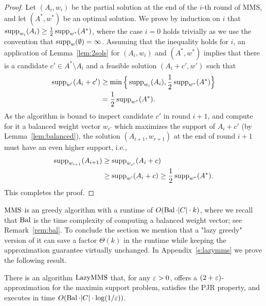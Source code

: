 \begin{proof}
Let $(A_i, w_i)$ be the partial solution at the end of the $i$-th round of MMS, and let $(A^*, w^*)$ be an optimal solution. 
We prove by induction on $i$ that $\operatorname{supp}_{w_i}(A_i)\geq \frac{1}{2}\operatorname{supp}_{w^*}(A^*)$, where the case $i=0$ holds trivially as we use the convention that $\operatorname{supp}_w(\emptyset)=\infty$.
Assuming that the inequality holds for $i$, an application of Lemma~\ref{lem:2sols} for $(A_i, w_i)$ and $(A^*, w^*)$ implies that there is a candidate $c'\in A^*\setminus A_i$ and a feasible solution $(A_i+c', w')$ such that 
\begin{align*}
\operatorname{supp}_{w'}(A_i+c') &\geq \min\Big\{\operatorname{supp}_{w_i}(A_i), \frac{1}{2} \operatorname{supp}_{w^*}(A^*)\Big\} \\
 &= \frac{1}{2} \operatorname{supp}_{w^*}(A^*).
\end{align*}
%
As the algorithm is bound to inspect candidate $c'$ in round $i+1$, and compute for it a balanced weight vector $w_{c'}$ which maximizes the support of $A_i+c'$ (by Lemma~\ref{lem:balanced}), the solution $(A_{i+1}, w_{r+1})$ at the end of round $i+1$ must have an even higher support, i.e., %
\begin{align*}
\operatorname{supp}_{w_{i+1}}(A_{i+1}) &\geq \operatorname{supp}_{w_{c'}}(A_i+c) \\ 
  &\geq \operatorname{supp}_{w'}(A_i+c) \geq \frac{1}{2} \operatorname{supp}_{w^*}(A^*).
\end{align*}
%
This completes the proof.
\end{proof}

$\operatorname{MMS}$ is an greedy algorithm with a runtime of $O(\operatorname{Bal} \cdot |C|\cdot k)$, where we recall that $\operatorname{Bal}$ is the time complexity of computing a balanced weight vector; see Remark~\ref{rem:bal}. 
To conclude the section we mention that a "lazy greedy" version of it can save a factor $\Theta(k)$ in the runtime while keeping the approximation guarantee virtually unchanged. 
In Appendix~\ref{s:lazymms} we prove the following result.

\begin{theorem}\label{thm:2eps}
There is an algorithm $\operatorname{LazyMMS}$ that, for any $\varepsilon>0$, offers a $(2+\varepsilon)$-approximation for the maximin support problem, satisfies the PJR property, and executes in time $O(\operatorname{Bal}\cdot |C|\cdot \log(1/\varepsilon))$.
\end{theorem}

